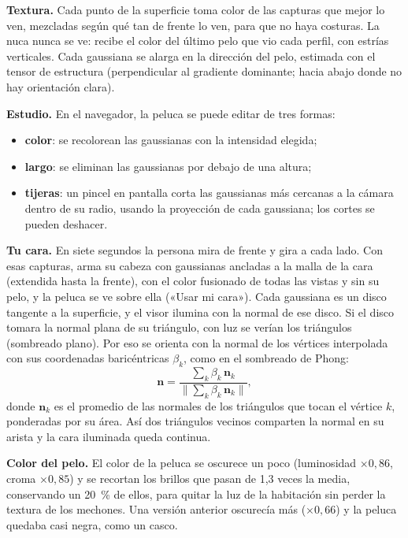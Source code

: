 \textbf{Textura.} Cada punto de la superficie toma color de las capturas que mejor lo ven, mezcladas según qué tan de frente lo ven, para que no haya costuras. La nuca nunca se ve: recibe el color del último pelo que vio cada perfil, con estrías verticales. Cada gaussiana se alarga en la dirección del pelo, estimada con el tensor de estructura (perpendicular al gradiente dominante; hacia abajo donde no hay orientación clara).

\textbf{Estudio.} En el navegador, la peluca se puede editar de tres formas:
\begin{itemize}
  \item \textbf{color}: se recolorean las gaussianas con la intensidad elegida;
  \item \textbf{largo}: se eliminan las gaussianas por debajo de una altura;
  \item \textbf{tijeras}: un pincel en pantalla corta las gaussianas más cercanas a la cámara dentro de su radio, usando la proyección de cada gaussiana; los cortes se pueden deshacer.
\end{itemize}

\textbf{Tu cara.} En siete segundos la persona mira de frente y gira a cada lado. Con esas capturas,  arma su cabeza con gaussianas ancladas a la malla de la cara (extendida hasta la frente), con el color fusionado de todas las vistas y sin su pelo, y la peluca se ve sobre ella («Usar mi cara»). Cada gaussiana es un disco tangente a la superficie, y el visor ilumina con la normal de ese disco. Si el disco tomara la normal plana de su triángulo, con luz se verían los triángulos (sombreado plano). Por eso se orienta con la normal de los vértices interpolada con sus coordenadas baricéntricas $\beta_k$, como en el sombreado de Phong:
\begin{equation}
  \mathbf{n} = \frac{\sum_k \beta_k\,\mathbf{n}_k}{\lVert \sum_k \beta_k\,\mathbf{n}_k \rVert},
\end{equation}
donde $\mathbf{n}_k$ es el promedio de las normales de los triángulos que tocan el vértice $k$, ponderadas por su área. Así dos triángulos vecinos comparten la normal en su arista y la cara iluminada queda continua.

\textbf{Color del pelo.} El color de la peluca se oscurece un poco (luminosidad $\times 0{,}86$, croma $\times 0{,}85$) y se recortan los brillos que pasan de 1,3 veces la media, conservando un 20~\% de ellos, para quitar la luz de la habitación sin perder la textura de los mechones. Una versión anterior oscurecía más ($\times 0{,}66$) y la peluca quedaba casi negra, como un casco.

